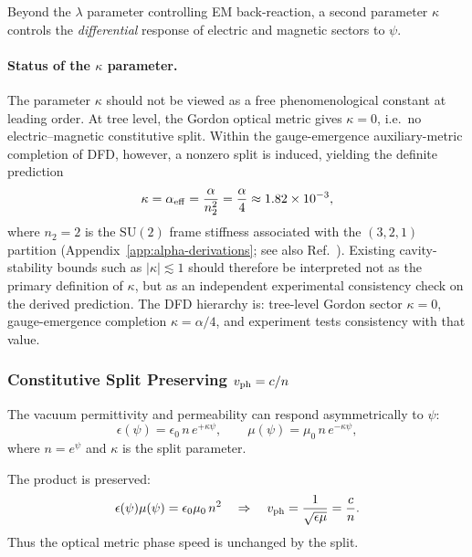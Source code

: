 Beyond the $\lambda$ parameter controlling EM back-reaction, a second 
parameter $\kappa$ controls the \textit{differential} 
response of electric and magnetic sectors to $\psi$.

\paragraph{Status of the $\kappa$ parameter.}
The parameter $\kappa$ should not be viewed as a free phenomenological
constant at leading order. At tree level, the Gordon optical metric gives
$\kappa = 0$, i.e.\ no electric--magnetic constitutive split. Within the
gauge-emergence auxiliary-metric completion of DFD, however, a nonzero
split is induced, yielding the definite prediction
\begin{equation}\label{eq:kappa-derived}
\kappa = \alpha_{\rm eff} = \frac{\alpha}{n_2^2} = \frac{\alpha}{4}
\approx 1.82\times 10^{-3},
\end{equation}
where $n_2 = 2$ is the $\mathrm{SU}(2)$ frame stiffness associated with
the $(3,2,1)$ partition (Appendix~\ref{app:alpha-derivations};
see also Ref.~\cite{AlcockVacuumLoading2026}).
Existing cavity-stability bounds such as
$|\kappa| \lesssim 1$ should therefore be interpreted not as the primary
definition of $\kappa$, but as an independent experimental consistency
check on the derived prediction. The DFD hierarchy is:
tree-level Gordon sector $\kappa = 0$, gauge-emergence completion
$\kappa = \alpha/4$, and experiment tests consistency with that value.

\subsubsection{Constitutive Split Preserving $v_{\rm ph} = c/n$}

The vacuum permittivity and permeability can respond asymmetrically to $\psi$:
\begin{equation}\label{eq:constitutive-split}
\epsilon(\psi) = \epsilon_0\, n\, e^{+\kappa\psi}, \qquad
\mu(\psi) = \mu_0\, n\, e^{-\kappa\psi},
\end{equation}
where $n = e^\psi$ and $\kappa$ is the split parameter.

The product is preserved:
\begin{equation}
\epsilon(\psi)\mu(\psi) = \epsilon_0\mu_0\, n^2 \quad \Rightarrow \quad
v_{\rm ph} = \frac{1}{\sqrt{\epsilon\mu}} = \frac{c}{n}.
\end{equation}
Thus the optical metric phase speed is unchanged by the split.

